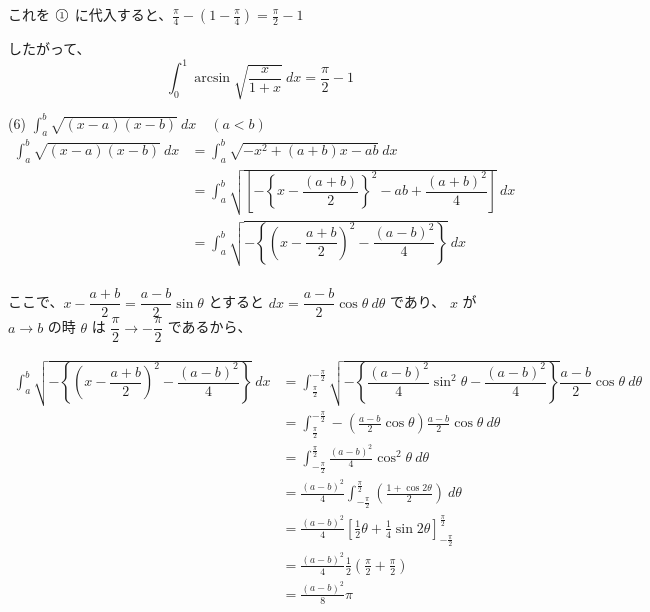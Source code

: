 \documentclass[a4j]{jsarticle}
\newcommand{\ctext}[1]{\raise0.2ex\hbox{\textcircled{\scriptsize{#1}}}} %
\begin{document}
    これを $\ctext{1}$ に代入すると、$\displaystyle \frac{\pi}{4} - \left(1 - \frac{\pi}{4}\right) = \frac{\pi}{2} - 1$

    したがって、
    \begin{equation*}
        \int_{0}^{1} \arcsin \sqrt{\frac{x}{1 + x}}  \: dx = \frac{\pi}{2} - 1
    \end{equation*}

    (6) $\displaystyle \int_{a}^{b} \sqrt{(x - a)(x - b)} \: dx \quad (a < b)$ \\

    \begin{align*}
        \int_{a}^{b} \sqrt{(x - a)(x - b)} \: dx &= \int_{a}^{b} \sqrt{-x^2 + (a + b)x - ab} \: dx \\
        &= \int_{a}^{b} \sqrt{\left[-\left\{x - \dfrac{(a + b)}{2}\right\}^2 - ab + \dfrac{(a + b)^2}{4}\right]} \: dx \\
        &= \int_{a}^{b} \sqrt{- \left\{ \left(x - \dfrac{a + b}{2} \right)^2 - \dfrac{\left(a - b\right)^2}{4} \right\}} \: dx \\
    \end{align*}

    ここで、$\displaystyle x - \dfrac{a + b}{2} = \dfrac{a - b}{2} \sin \theta$ とすると $\displaystyle dx = \dfrac{a - b}{2} \cos \theta \: d\theta$ であり、
    $x$ が $a \rightarrow b$ の時 $\theta$ は $\displaystyle \dfrac{\pi}{2} \rightarrow -\dfrac{\pi}{2}$ であるから、

    \begin{align*}
        \int_{a}^{b} \sqrt{- \left\{ \left(x - \dfrac{a + b}{2} \right)^2 - \dfrac{\left(a - b\right)^2}{4} \right\}} \: dx &= \int_{\frac{\pi}{2}}^{-\frac{\pi}{2}} \sqrt{- \left\{ \dfrac{\left(a - b\right)^2}{4} \sin^2\theta - \dfrac{\left(a - b\right)^2}{4} \right\}} \dfrac{a - b}{2} \cos \theta \: d\theta \\
        &= \int_{\frac{\pi}{2}}^{-\frac{\pi}{2}} - \left(\frac{a - b}{2} \cos \theta \right) \frac{a - b}{2} \cos \theta \: d\theta \\
        &= \int_{-\frac{\pi}{2}}^{\frac{\pi}{2}} \frac{(a - b)^2}{4} \cos^2 \theta \: d \theta \\
        &= \frac{(a - b)^2}{4} \int_{-\frac{\pi}{2}}^{\frac{\pi}{2}} \left(\frac{1 + \cos {2\theta}}{2}\right) \: d \theta \\
        &= \frac{(a - b)^2}{4} \left[\frac{1}{2} \theta + \frac{1}{4} \sin {2\theta}\right]_{-\frac{\pi}{2}}^{\frac{\pi}{2}} \\
        &= \frac{(a - b)^2}{4} \frac{1}{2} \left(\frac{\pi}{2} +\frac{\pi}{2}\right) \\
        &= \frac{\left(a - b\right)^2}{8} \pi
    \end{align*}
\end{document}
